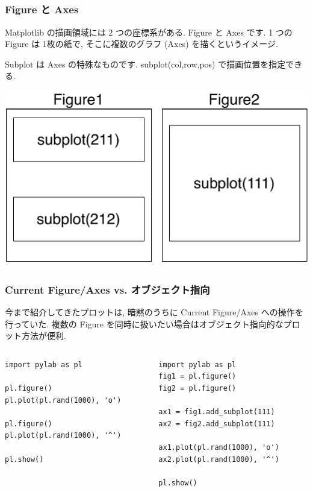 \subsection*{\redm\whitem\greenb}
\begin{frame}[t,fragile]
\frametitle{Figure と Axes}
Matplotlib の描画領域には 2 つの座標系がある. 
Figure と Axes です. 1 つの Figure は 1枚の紙で, そこに複数のグラフ (Axes) を描くというイメージ. 

Subplot は Axes の特殊なものです. subplot(col,row,pos) で描画位置を指定できる. 

\begin{center}
\includegraphics[scale=0.4]{fig_ax.pdf}
\end{center}
\end{frame}

\subsection*{\redm\whitem\greenb}
\begin{frame}[t,fragile]
\frametitle{Current Figure/Axes vs. オブジェクト指向}
今まで紹介してきたプロットは, 暗黙のうちに Current Figure/Axes への操作を行っていた. 複数の Figure を同時に扱いたい場合はオブジェクト指向的なプロット方法が便利.

\begin{columns}
\begin{column}{.52\textwidth}
\begin{lstlisting}
import pylab as pl

pl.figure() 
pl.plot(pl.rand(1000), 'o')

pl.figure()
pl.plot(pl.rand(1000), '^')

pl.show()
\end{lstlisting}
\end{column}

\begin{column}{.52\textwidth}
\begin{lstlisting}
import pylab as pl
fig1 = pl.figure() 
fig2 = pl.figure()

ax1 = fig1.add_subplot(111)  
ax2 = fig2.add_subplot(111)  

ax1.plot(pl.rand(1000), 'o')
ax2.plot(pl.rand(1000), '^')

pl.show()
\end{lstlisting}
\end{column}
\end{columns}
\end{frame}

